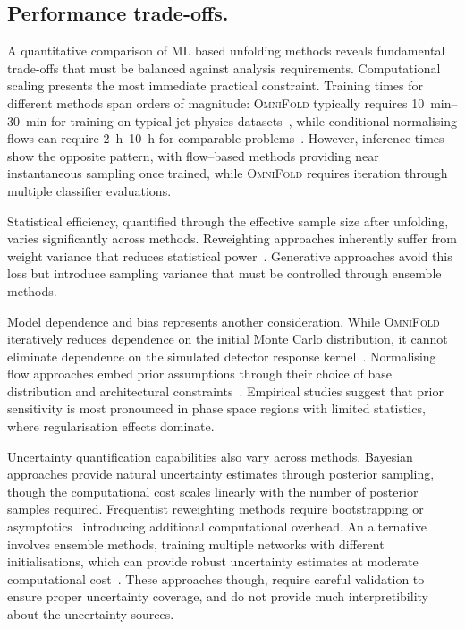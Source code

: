     \subsection{Performance trade-offs.}
    
        A quantitative comparison of ML based unfolding methods reveals fundamental trade-offs that must be balanced against analysis requirements.
        Computational scaling presents the most immediate practical constraint.
        Training times for different methods span orders of magnitude: \textsc{OmniFold} typically requires \qtyrange{10}{30}{\minute} for training on typical jet physics datasets~\cite{ML4Jets2020}, while conditional normalising flows can require \qtyrange{2}{10}{\hour} for comparable problems~\cite{Bellagente2020InvertibleAgain}.
        However, inference times show the opposite pattern, with flow--based methods providing near instantaneous sampling once trained, while \textsc{OmniFold} requires iteration through multiple classifier evaluations.

        Statistical efficiency, quantified through the effective sample size after unfolding, varies significantly across methods.
        Reweighting approaches inherently suffer from weight variance that reduces statistical power~\cite{collaboration_measurement_2025}.
        Generative approaches avoid this loss but introduce sampling variance that must be controlled through ensemble methods.
        
        Model dependence and bias represents another consideration.
        While \textsc{OmniFold} iteratively reduces dependence on the initial Monte Carlo distribution, it cannot eliminate dependence on the simulated detector response kernel~\cite{andreassen_omnifold_2020}.
        Normalising flow approaches embed prior assumptions through their choice of base distribution and architectural constraints~\cite{papamakarios_masked_2018}.
        Empirical studies suggest that prior sensitivity is most pronounced in phase space regions with limited statistics, where regularisation effects dominate.

        Uncertainty quantification capabilities also vary  across methods.
        Bayesian approaches provide natural uncertainty estimates through posterior sampling, though the computational cost scales linearly with the number of posterior samples required.
        Frequentist reweighting methods require bootstrapping or asymptotics~\cite{Cowan2011AsymptoticPhysics} introducing additional computational overhead.
        An alternative involves ensemble methods, training multiple networks with different initialisations, which can provide robust uncertainty estimates at moderate computational cost~\cite{mishra_uncertainty_2021}.
        These approaches though, require careful validation to ensure proper uncertainty coverage, and do not provide much interpretibility about the uncertainty sources.

